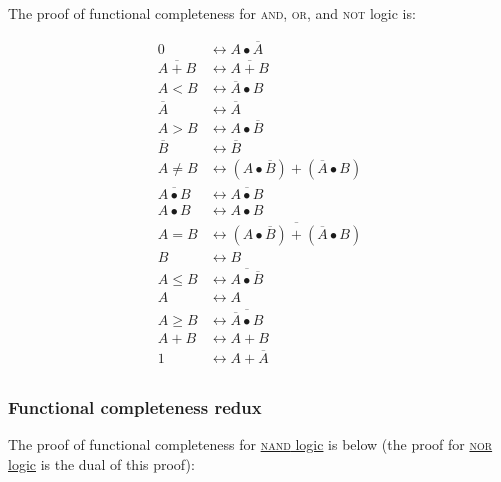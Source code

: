 \documentclass[11pt]{article}%
\begin{document}
\begin{multicols}{2}
The proof of functional completeness for \textsc{and}, \textsc{or}, and \textsc{not} logic is:

\begin{align*}
 0 &\leftrightarrow A \bullet \overline{A} \\
 \overline{A + B} &\leftrightarrow \overline{A + B} \\
 A < B &\leftrightarrow \overline{A} \bullet B \\
 \overline{A} &\leftrightarrow \overline{A} \\
 A > B &\leftrightarrow A \bullet \overline{B} \\
 \overline{B} &\leftrightarrow \overline{B} \\
 A \ne B &\leftrightarrow \left( A \bullet \overline{B} \right) + \left( \overline{A} \bullet B \right) \\
 \overline{A \bullet B} &\leftrightarrow \overline{A \bullet B} \\
 A \bullet B &\leftrightarrow A \bullet B \\
 A = B &\leftrightarrow \overline{\left( A \bullet \overline{B} \right) + \left( \overline{A} \bullet B \right)} \\
 B &\leftrightarrow B \\
 A \le B &\leftrightarrow \overline{A \bullet \overline{B}} \\
 A &\leftrightarrow A \\
 A \ge B &\leftrightarrow \overline{\overline{A} \bullet B} \\
 A + B &\leftrightarrow A + B \\
 1 &\leftrightarrow A + \overline{A} \\
\end{align*}

\subsubsection{Functional completeness redux}
\label{CompletenessRedux}

The proof of functional completeness for \href{https://en.wikipedia.org/wiki/NAND_logic}{\textsc{nand} logic} \nocite{wiki:nand-logic} is below (the proof for \href{https://en.wikipedia.org/wiki/NOR_logic}{\textsc{nor} logic} \nocite{wiki:nor-logic} is the dual of this proof):


\end{multicols}
\end{document}
